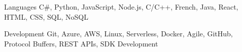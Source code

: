 
\begin{cvskills}
	\cvskill
		{Languages}
		{C\#, Python, JavaScript, Node.js, C/C++, French, Java, React, HTML, CSS, SQL, NoSQL}

	\cvskill
		{Development}
		{Git, Azure, AWS, Linux, Serverless, Docker, Agile, GitHub, Protocol Buffers, REST APIs, SDK Development}
\end{cvskills}
